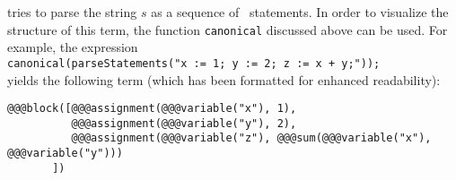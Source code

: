 \begin{enumerate}
      tries to parse the string $s$ as a sequence of \setlx\ statements.   In order to visualize the structure of
      this term,  the function \texttt{canonical} discussed above can be used.  For
      example, the expression
      \\[0.2cm]
      \hspace*{1.3cm}
      \texttt{canonical(parseStatements("x := 1; y := 2; z := x + y;"));}
      \\[0.2cm]
      yields the following term (which has been formatted for enhanced readability):
\begin{verbatim}
@@@block([@@@assignment(@@@variable("x"), 1), 
          @@@assignment(@@@variable("y"), 2), 
          @@@assignment(@@@variable("z"), @@@sum(@@@variable("x"), @@@variable("y")))
       ])
\end{verbatim}
\end{enumerate}

